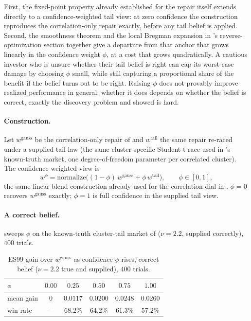 \documentclass[11pt]{article}
\begin{document}
First, the fixed-point property already established for the repair itself
extends directly to a confidence-weighted tail view: at zero confidence the
construction reproduces the correlation-only repair exactly, before any
tail belief is applied. Second, the smoothness theorem and the local
Bregman expansion in \textcite{cotton2026polish}'s reverse-optimization
section together give a departure from that anchor that grows linearly in
the confidence weight $\phi$, at a cost that grows quadratically. A
cautious investor who is unsure whether their tail belief is right can cap
its worst-case damage by choosing $\phi$ small, while still capturing a
proportional share of the benefit if the belief turns out to be right.
Raising $\phi$ does not provably improve realized performance in general:
whether it does depends on whether the belief is correct, exactly the
discovery problem  and  showed
is hard.

\paragraph{Construction.} Let $w^{\mathrm{gauss}}$ be the correlation-only
repair of  and $w^{\mathrm{tail}}$ the same repair
re-raced under a supplied tail law (the same cluster-specific Student-t
race used in 's known-truth market, one degree-of-freedom
parameter per correlated cluster). The confidence-weighted view is
\[
  w^\phi = \mathrm{normalize}\big((1-\phi)\,w^{\mathrm{gauss}} + \phi\,w^{\mathrm{tail}}\big),
  \qquad \phi\in[0,1],
\]
the same linear-blend construction already used for the correlation dial
in \textcite{cotton2026polish}. $\phi=0$ recovers $w^{\mathrm{gauss}}$
exactly; $\phi=1$ is full confidence in the supplied tail view.

\paragraph{A correct belief.}  sweeps $\phi$ on the
known-truth cluster-tail market of  ($\nu=2.2$,
supplied correctly), $400$ trials.

\begin{table}[h]
\centering
\caption{ES99 gain over $w^{\mathrm{gauss}}$ as confidence $\phi$ rises,
correct belief ($\nu=2.2$ true and supplied), $400$ trials.}
\label{tab:tailbelief}
\footnotesize
\begin{tabular}{lccccc}
\toprule
$\phi$ & $0.00$ & $0.25$ & $0.50$ & $0.75$ & $1.00$ \\
\midrule
mean gain & $0$ & $0.0117$ & $0.0200$ & $0.0248$ & $0.0260$ \\
win rate  & --- & $68.2\%$ & $64.2\%$ & $61.3\%$ & $57.2\%$ \\
\bottomrule
\end{tabular}
\end{table}
\end{document}
